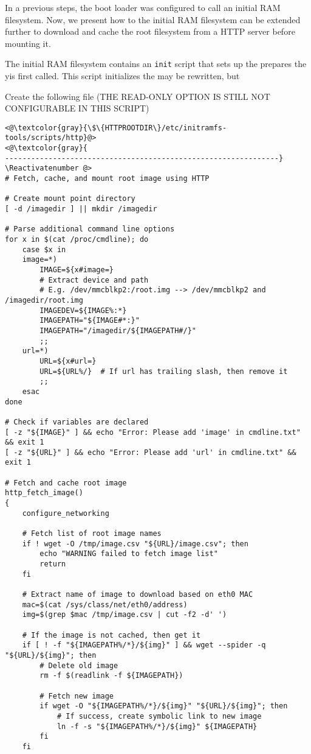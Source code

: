 In a previous steps, the boot loader was configured to call an initial \ac{RAM}
filesystem. Now, we present how to the initial \ac{RAM}
filesystem can be extended further to download and cache the root filesystem
from a \ac{HTTP} server before mounting it.

The initial \ac{RAM} filesystem contains an \texttt{init} script that
sets up the prepares the yis first
called. This script initializes the  may be rewritten, but

Create the following file (THE READ-ONLY OPTION IS STILL NOT CONFIGURABLE IN THIS SCRIPT)
\Suppressnumber\begin{lstlisting}[]
<@\textcolor{gray}{\$\{HTTPROOTDIR\}/etc/initramfs-tools/scripts/http}@>
<@\textcolor{gray}{
---------------------------------------------------------------}
\Reactivatenumber @>
# Fetch, cache, and mount root image using HTTP

# Create mount point directory
[ -d /imagedir ] || mkdir /imagedir

# Parse additional command line options
for x in $(cat /proc/cmdline); do
    case $x in
    image=*)
        IMAGE=${x#image=}
        # Extract device and path
        # E.g. /dev/mmcblkp2:/root.img --> /dev/mmcblkp2 and /imagedir/root.img
        IMAGEDEV=${IMAGE%:*}
        IMAGEPATH="${IMAGE#*:}"
        IMAGEPATH="/imagedir/${IMAGEPATH#/}"
        ;;
    url=*)
        URL=${x#url=}
        URL=${URL%/}  # If url has trailing slash, then remove it
        ;;
    esac
done

# Check if variables are declared
[ -z "${IMAGE}" ] && echo "Error: Please add 'image' in cmdline.txt" && exit 1
[ -z "${URL}" ] && echo "Error: Please add 'url' in cmdline.txt" && exit 1

# Fetch and cache root image
http_fetch_image()
{
    configure_networking

    # Fetch list of root image names
    if ! wget -O /tmp/image.csv "${URL}/image.csv"; then
        echo "WARNING failed to fetch image list"
        return
    fi

    # Extract name of image to download based on eth0 MAC
    mac=$(cat /sys/class/net/eth0/address)
    img=$(grep $mac /tmp/image.csv | cut -f2 -d' ')

    # If the image is not cached, then get it
    if [ ! -f "${IMAGEPATH%/*}/${img}" ] && wget --spider -q "${URL}/${img}"; then
        # Delete old image
        rm -f $(readlink -f ${IMAGEPATH})

        # Fetch new image
        if wget -O "${IMAGEPATH%/*}/${img}" "${URL}/${img}"; then
            # If success, create symbolic link to new image
            ln -f -s "${IMAGEPATH%/*}/${img}" ${IMAGEPATH}
        fi
    fi


\end{lstlisting}
